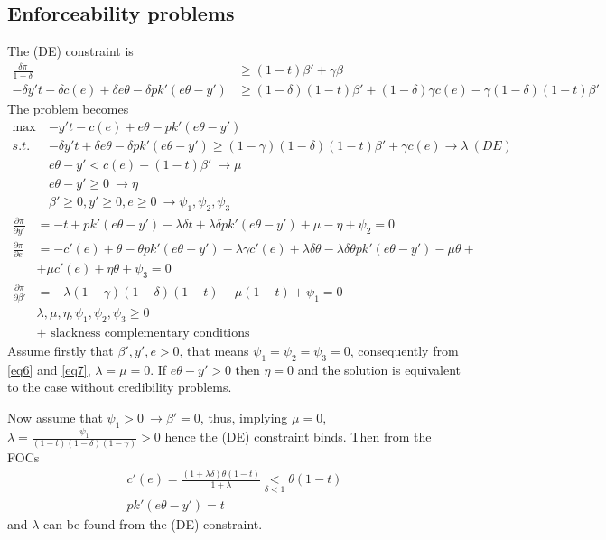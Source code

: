 \documentclass[a4paper]{article}
\begin{document}
\subsection{Enforceability problems}
The (DE) constraint is
\begin{align*}
\frac{\delta \pi}{1 - \delta} &\ge (1 - t)\beta' + \gamma \beta\\
-\delta y't - \delta c(e) + \delta e \theta -\delta pk'(e \theta - y') &\ge (1 - \delta)(1 - t)\beta' + (1 - \delta)\gamma c(e) - \gamma (1 - \delta )(1 - t)\beta'
\end{align*}
The problem becomes
\begin{align*}
\max\ &-y't - c(e) + e \theta -pk'(e \theta - y')\\
s.t.\ &-\delta y't + \delta e \theta -\delta pk'(e \theta - y') \ge (1 - \gamma)(1 - \delta)(1 - t)\beta' + \gamma c(e)\to \lambda \ (DE)\\
& e \theta - y' < c(e) - (1-t)\beta'\ \to \mu \\
& e\theta - y' \ge 0\ \to \eta\\
& \beta' \ge 0, y' \ge 0, e \ge 0\ \to \psi_1, \psi_2,\psi_3
\end{align*}
\begin{align}
\frac{\partial \pi}{\partial y'} &= -t + pk'(e \theta - y') - \lambda \delta t + \lambda \delta pk'(e \theta - y') + \mu - \eta + \psi_2 = 0 \label{eq4}\\
\frac{\partial \pi}{\partial e} &= -c'(e)+\theta - \theta pk'(e\theta - y')- \lambda \gamma c'(e) + \lambda \delta \theta - \lambda \delta \theta pk'(e \theta - y') - \mu \theta + \nonumber\\
&+\mu c'(e) + \eta \theta+ \psi_3 = 0\label{eq5}\\
\frac{\partial \pi}{\partial \beta'} &= - \lambda(1-\gamma)(1-\delta)(1-t) - \mu(1-t) + \psi_1 = 0\label{eq6}\\
& \lambda, \mu, \eta, \psi_1, \psi_2, \psi_3 \ge 0 \label{eq7}\\
&+\text{ slackness complementary conditions}\nonumber
\end{align}
Assume firstly that $\beta', y', e >0$, that means $\psi_1 = \psi_2=\psi_3 = 0$, consequently from \eqref{eq6} and \eqref{eq7}, $\lambda = \mu = 0$. If $e \theta - y' > 0$ then $\eta = 0$ and the solution is equivalent to the case without credibility problems. 


Now assume that $\psi_1 > 0\ \to \beta' = 0$, thus, implying $\mu = 0$, $\lambda = \frac{\psi_1}{(1-t)(1-\delta)(1-\gamma)} > 0$ hence the (DE) constraint binds. Then from the FOCs
\begin{align*}
c'(e) = \frac{(1 + \lambda \delta)\theta(1-t)}{1+\lambda} \underset{\delta < 1}{<}\theta(1-t)\\
pk'(e\theta - y') = t
\end{align*}
and $\lambda$ can be found from the (DE) constraint.
\end{document}
